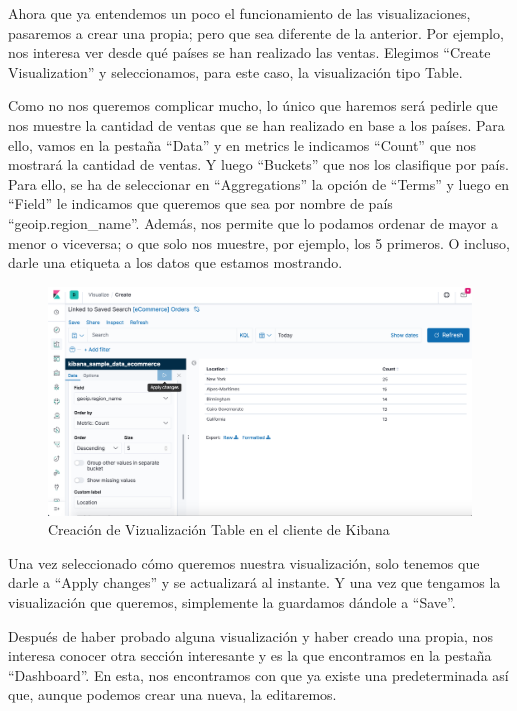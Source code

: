 \documentclass[a4paper, 12pt]{book}
\begin{document}
Ahora que ya entendemos un poco el funcionamiento de las visualizaciones, pasaremos a crear una propia; pero que sea diferente de la anterior. Por ejemplo, nos interesa ver desde qué países se han realizado las ventas. Elegimos “Create Visualization” y seleccionamos, para este caso, la visualización tipo Table. 

Como no nos queremos complicar mucho, lo único que haremos será pedirle que nos muestre la cantidad de ventas que se han realizado en base a los países. Para ello, vamos en la pestaña “Data” y en metrics le indicamos “Count” que nos mostrará la cantidad de ventas. Y luego “Buckets” que nos los clasifique por país. Para ello, se ha de seleccionar en “Aggregations” la opción de “Terms” y luego en “Field” le indicamos que queremos que sea por nombre de país “geoip.region\_name”. Además, nos permite que lo podamos ordenar de mayor a menor o viceversa; o que solo nos muestre, por ejemplo, los 5 primeros. O incluso, darle una etiqueta a los datos que estamos mostrando.

\begin{figure}[H]
  \centering
  \includegraphics[width=12cm, keepaspectratio]{img/development/kibana-table-editor.png}
  \caption{Creación de Vizualización Table en el cliente de Kibana}
  \label{fig:kibanatable}
\end{figure}

Una vez seleccionado cómo queremos nuestra visualización, solo tenemos que darle a “Apply changes” y se actualizará al instante. Y una vez que tengamos la visualización que queremos, simplemente la guardamos dándole a “Save”.

Después de haber probado alguna visualización y haber creado una propia, nos interesa conocer otra sección interesante y es la que encontramos en la pestaña “Dashboard”. En esta, nos encontramos con que ya existe una predeterminada así que, aunque podemos crear una nueva, la editaremos.
\end{document}
